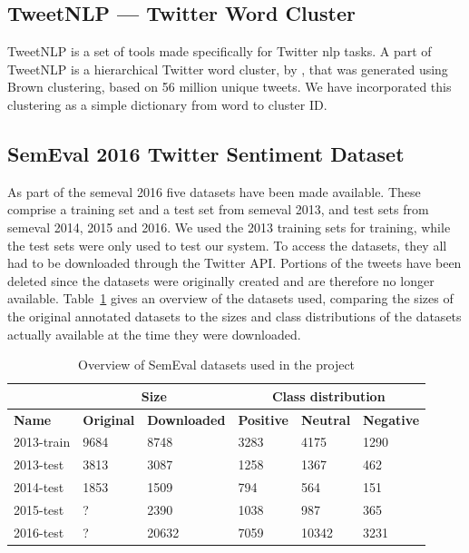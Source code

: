 \subsection{TweetNLP --- Twitter Word Cluster}
\label{sec:tweetnlp}
TweetNLP is a set of tools made specifically for Twitter \ac{nlp} tasks. A part of TweetNLP is a hierarchical Twitter word cluster, by \cite{Owoputi12}, that was generated using Brown clustering, based on 56 million unique tweets. We have incorporated this clustering as a simple dictionary from word to cluster ID. 

\subsection{SemEval 2016 Twitter Sentiment Dataset}
As part of the \ac{semeval} 2016 five datasets have been made available. These comprise a training set and a test set from \ac{semeval} 2013, and test sets from \ac{semeval} 2014, 2015 and 2016. We used the 2013 training sets for training, while the test sets were only used to test our system. To access the datasets, they all had to be downloaded through the Twitter API. Portions of the tweets have been deleted since the datasets were originally created and are therefore no longer available. Table~\ref{tab:dataset_overview} gives an overview of the datasets used, comparing the sizes of the original annotated datasets to the sizes and class distributions of the datasets actually available at the time they were downloaded.

\makeatletter
    \setlength{}
\makeatother

\begin{table}[htbp]
    \begin{tabular}{| l | l | l | l | l | l |}
        \hline
         & \multicolumn{2}{c|}{\textbf{Size}} & \multicolumn{3}{c|}{\textbf{Class distribution}} \\ \hline
        \textbf{Name} & \textbf{Original} & \textbf{Downloaded} & \textbf{Positive} & \textbf{Neutral} & \textbf{Negative} \\ \hline
        2013-train & 9684 & 8748 & 3283 & 4175 & 1290 \\ \hline
        2013-test & 3813 & 3087 & 1258 & 1367 & 462 \\ \hline
        2014-test & 1853 & 1509 & 794 & 564 & 151 \\ \hline
        2015-test & ? & 2390 & 1038 & 987 & 365 \\ \hline
        2016-test & ? & 20632 & 7059 & 10342 & 3231 \\ \hline
    \end{tabular}
    \caption{Overview of SemEval datasets used in the project}
    \label{tab:dataset_overview}
\end{table}

\glsresetall
